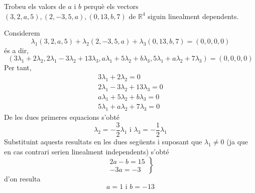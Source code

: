 \begin{exercici}
Trobeu els valors de $a$ i $b$ perquè els vectors $%
(3,2,a,5),(2,-3,5,a),(0,13,b,7)$ de $\mathbb{R}^{4}$ siguin linealment
dependents.

\end{exercici}
\begin{solucio}
Considerem%
\begin{equation*}
\lambda _{1}(3,2,a,5)+\lambda _{2}(2,-3,5,a)+\lambda _{3}(0,13,b,7)=(0,0,0,0)
\end{equation*}%
és a dir,%
\begin{equation*}
(3\lambda _{1}+2\lambda _{2},2\lambda _{1}-3\lambda _{2}+13\lambda
_{3},a\lambda _{1}+5\lambda _{2}+b\lambda _{3},5\lambda _{1}+a\lambda
_{2}+7\lambda _{3})=(0,0,0,0)
\end{equation*}%
Per tant,%
\begin{equation*}
\begin{array}{r}
3\lambda _{1}+2\lambda _{2}=0 \\
2\lambda _{1}-3\lambda _{2}+13\lambda _{3}=0 \\
a\lambda _{1}+5\lambda _{2}+b\lambda _{3}=0 \\
5\lambda _{1}+a\lambda _{2}+7\lambda _{3}=0%
\end{array}%
\end{equation*}%
De les dues primeres equacions s’obté%
\begin{equation*}
\lambda _{2}=-\frac{3}{2}\lambda _{1}\text{ \ i \ }\lambda _{3}=-\frac{1}{2}%
\lambda _{1}
\end{equation*}%
Substituint aquests resultats en les dues següents i suposant que $%
\lambda _{1}\neq 0$ (ja que en cas contrari serien linealment
independents) s’obté%
\begin{equation*}
\left.
\begin{array}{r}
2a-b=15 \\
-3a=-3%
\end{array}%
\right\}
\end{equation*}%
d’on resulta%
\begin{equation*}
a=1\text{ \ i \ }b=-13
\end{equation*}
\end{solucio}

